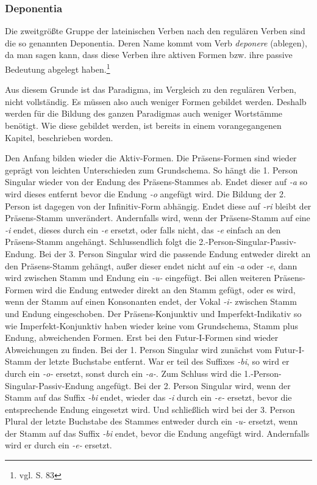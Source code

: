 \subsubsection{Deponentia}
Die zweitgrößte Gruppe der lateinischen Verben nach den regulären Verben sind die so genannten Deponentia. Deren Name kommt vom Verb \textit{deponere} (ablegen), da man sagen kann, dass diese Verben ihre aktiven Formen bzw. ihre passive Bedeutung abgelegt haben.\footnote{vgl. \cite{BAYER-LINDAUER1994} S. 83} \par
Aus diesem Grunde ist das Paradigma, im Vergleich zu den regulären Verben, nicht vollständig. Es müssen also auch weniger Formen gebildet werden. Deshalb werden für die Bildung des ganzen Paradigmas auch weniger Wortstämme benötigt. Wie diese gebildet werden, ist bereits in einem vorangegangenen Kapitel, beschrieben worden. \par
Den Anfang bilden wieder die Aktiv-Formen. Die Präsens-Formen sind wieder geprägt von leichten Unterschieden zum Grundschema. So hängt die 1. Person Singular wieder von der Endung des Präsens-Stammes ab. Endet dieser auf \textit{-a} so wird dieses entfernt bevor die Endung \textit{-o} angefügt wird. Die Bildung der 2. Person ist dagegen von der Infinitiv-Form abhängig. Endet diese auf \textit{-ri} bleibt der Präsens-Stamm unverändert. Andernfalls wird, wenn der Präsens-Stamm auf eine \textit{-i} endet, dieses durch ein \textit{-e} ersetzt, oder falls nicht, das \textit{-e} einfach an den Präsens-Stamm angehängt. Schlussendlich folgt die 2.-Person-Singular-Passiv-Endung. Bei der 3. Person Singular wird die passende Endung entweder direkt an den Präsens-Stamm gehängt, außer dieser endet nicht auf ein \textit{-a} oder \textit{-e}, dann wird zwischen Stamm und Endung ein \textit{-u-} eingefügt. Bei allen weiteren Präsens-Formen wird die Endung entweder direkt an den Stamm gefügt, oder es wird, wenn der Stamm auf einen Konsonanten endet, der Vokal \textit{-i-} zwischen Stamm und Endung eingeschoben. Der Präsens-Konjunktiv und Imperfekt-Indikativ so wie Imperfekt-Konjunktiv haben wieder keine vom Grundschema, Stamm plus Endung, abweichenden Formen. Erst bei den Futur-I-Formen sind wieder Abweichungen zu finden. Bei der 1. Person Singular wird zunächst vom Futur-I-Stamm der letzte Buchstabe entfernt. War er teil des Suffixes \textit{-bi}, so wird er durch ein \textit{-o-} ersetzt, sonst durch ein \textit{-a-}. Zum Schluss wird die 1.-Person-Singular-Passiv-Endung angefügt. Bei der 2. Person Singular wird, wenn der Stamm auf das Suffix \textit{-bi} endet, wieder das \textit{-i} durch ein \textit{-e-} ersetzt, bevor die entsprechende Endung eingesetzt wird. Und schließlich wird bei der 3. Person Plural der letzte Buchstabe des Stammes entweder durch ein \textit{-u-} ersetzt, wenn der Stamm auf das Suffix \textit{-bi} endet, bevor die Endung angefügt wird. Andernfalls wird er durch ein \textit{-e-} ersetzt. \par

